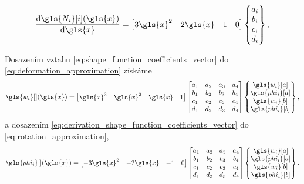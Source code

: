 \begin{equation}
    \label{eq:derivation_shape_function_coefficients_vector}
    \dv{\gls{N_i}[i](\gls{x})}{\gls{x}} = 
    \begin{bmatrix}
        3\gls{x}^2 &
        2\gls{x} &
        1 &
        0
    \end{bmatrix}
    \begin{Bmatrix}
        a_i \\
        b_i \\
        c_i \\
        d_i \\
    \end{Bmatrix},
\end{equation}

Dosazením vztahu \ref{eq:shape_function_coefficients_vector} do \ref{eq:deformation_approximation} získáme
\begin{equation}
    \label{eq:w_midstep}
    \gls{w_i}[ ] (\gls{x}) = 
    \begin{bmatrix}
        \gls{x}^3 &
        \gls{x}^2 &
        \gls{x} &
        1
    \end{bmatrix}
    \begin{bmatrix}
        a_1 & a_2 & a_3 & a_4 \\
        b_1 & b_2 & b_3 & b_4 \\
        c_1 & c_2 & c_3 & c_4 \\
        d_1 & d_2 & d_3 & d_4 \\
    \end{bmatrix}
    \begin{Bmatrix}
        \gls{w_i}[a] \\
        \gls{phi_i}[a] \\
        \gls{w_i}[b] \\
        \gls{phi_i}[b] \\
    \end{Bmatrix},
\end{equation}
a dosazením \ref{eq:derivation_shape_function_coefficients_vector} do \ref{eq:rotation_approximation},
\begin{equation}
    \label{eq:phi_midstep}
    \gls{phi_i}[ ] (\gls{x}) = 
    \begin{bmatrix}
        - 3\gls{x}^2 &
        - 2\gls{x} &
        - 1 &
        0
    \end{bmatrix}
    \begin{bmatrix}
        a_1 & a_2 & a_3 & a_4 \\
        b_1 & b_2 & b_3 & b_4 \\
        c_1 & c_2 & c_3 & c_4 \\
        d_1 & d_2 & d_3 & d_4 \\
    \end{bmatrix}
    \begin{Bmatrix}
        \gls{w_i}[a] \\
        \gls{phi_i}[a] \\
        \gls{w_i}[b] \\
        \gls{phi_i}[b] \\
    \end{Bmatrix}.
\end{equation}
